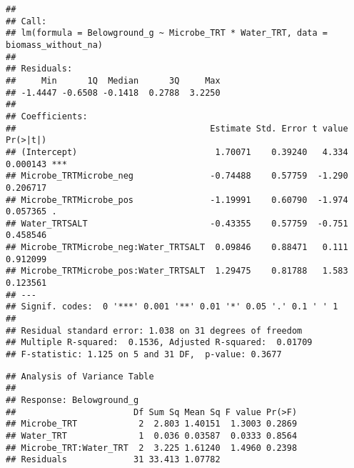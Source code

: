 \documentclass[
]{article}
\begin{document}
\begin{verbatim}
## 
## Call:
## lm(formula = Belowground_g ~ Microbe_TRT * Water_TRT, data = biomass_without_na)
## 
## Residuals:
##     Min      1Q  Median      3Q     Max 
## -1.4447 -0.6508 -0.1418  0.2788  3.2250 
## 
## Coefficients:
##                                      Estimate Std. Error t value Pr(>|t|)    
## (Intercept)                           1.70071    0.39240   4.334 0.000143 ***
## Microbe_TRTMicrobe_neg               -0.74488    0.57759  -1.290 0.206717    
## Microbe_TRTMicrobe_pos               -1.19991    0.60790  -1.974 0.057365 .  
## Water_TRTSALT                        -0.43355    0.57759  -0.751 0.458546    
## Microbe_TRTMicrobe_neg:Water_TRTSALT  0.09846    0.88471   0.111 0.912099    
## Microbe_TRTMicrobe_pos:Water_TRTSALT  1.29475    0.81788   1.583 0.123561    
## ---
## Signif. codes:  0 '***' 0.001 '**' 0.01 '*' 0.05 '.' 0.1 ' ' 1
## 
## Residual standard error: 1.038 on 31 degrees of freedom
## Multiple R-squared:  0.1536, Adjusted R-squared:  0.01709 
## F-statistic: 1.125 on 5 and 31 DF,  p-value: 0.3677
\end{verbatim}

\begin{verbatim}
## Analysis of Variance Table
## 
## Response: Belowground_g
##                       Df Sum Sq Mean Sq F value Pr(>F)
## Microbe_TRT            2  2.803 1.40151  1.3003 0.2869
## Water_TRT              1  0.036 0.03587  0.0333 0.8564
## Microbe_TRT:Water_TRT  2  3.225 1.61240  1.4960 0.2398
## Residuals             31 33.413 1.07782
\end{verbatim}
\end{document}

